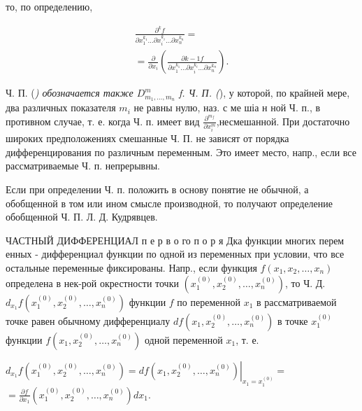 \documentclass[10pt]{article}
\begin{document}
то, по определению,



\[

\begin{gathered}

\frac{\partial^{k} f}{\partial x_{1}^{k_{1}} \ldots \partial x_{i}^{k_{i}} \ldots \partial x_{n}^{k_{n}}}= \\

=\frac{\partial}{\partial x_{i}}\left(\frac{\partial k-1 f}{\partial x_{1}^{k_{1}} \ldots \partial x_{i}^{k_{i}} \ldots \partial x_{n}^{k_{n}}}\right) .

\end{gathered}

\]



Ч. П. (\textit{) обозначается также $D_{m_{1}, \ldots, m_{n}}^{m}$ f. Ч. П. (}), у которой, по крайней мере, два различных показателя $m_{i}$ не равны нулю, наз. с ме шіа н ной Ч. п., в противном случае, т. е. когда Ч. п. имеет вид $\frac{\partial^{m_{f}}}{\partial x_{i}^{m}}$,несмешанной. При достаточно широких предположениях смешанные Ч. П. не зависят от порядка дифференцирования по различным переменным. Это имеет место, напр., если все рассматриваемые Ч. п. непрерывны.



Если при определении Ч. п. положить в основу понятие не обычной, а обобщенной в том или ином смысле производной, то получают определение обобщенной Ч. П. Л. Д. Кудрявцев.



ЧАСТНЫЙ ДИФФЕРЕНЦИАЛ п е р в о го п о р я Дка функции многих перем енных - дифференциал функции по одной из переменных при условии, что все остальные переменные фиксированы. Напр., если функция $f\left(x_{1}, x_{2}, \ldots, x_{n}\right)$ определена в нек-рой окрестности точки $\left(x_{1}^{(0)}, x_{2}^{(0)}, \ldots, x_{n}^{(0)}\right)$, то Ч. Д. $d_{x_{1}} f\left(x_{1}^{(0)}, x_{2}^{(0)}, \ldots, x_{n}^{(0)}\right)$ функции $f$ по переменной $x_{1}$ в рассматриваемой точке равен обычному дифференциалу $d f\left(x_{1}, x_{2}^{(0)}, \ldots, x_{n}^{(0)}\right)$ в точке $x_{1}^{(0)}$ функции $f\left(x_{1}, x_{2}^{(0)}, \ldots, x_{n}^{(0)}\right)$ одной переменной $x_{1}$, т. е.



$d_{x_{1}} f\left(x_{1}^{(0)}, x_{2}^{(0)}, \ldots, x_{n}^{(0)}\right)=\left.d f\left(x_{1}, x_{2}^{(0)}, \ldots, x_{n}^{(0)}\right)\right|_{x_{1}=x_{1}^{(0)}}=$ $=\frac{\partial f}{\partial x_{1}}\left(x_{1}^{(0)}, x_{2}^{(0)}, \ldots, x_{n}^{(0)}\right) d x_{1}$.
\end{document}
